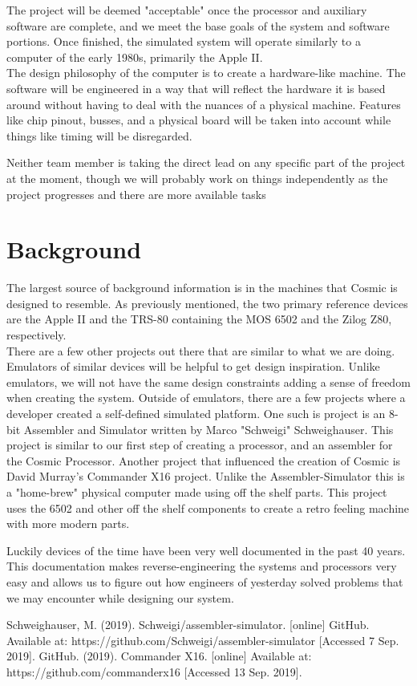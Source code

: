 \documentclass[conference]{IEEEtran}
\begin{document}
The project will be deemed "acceptable" once the processor and auxiliary software are complete, and we meet the base goals of the system and software portions. Once finished, the simulated system will operate similarly to a computer of the early 1980s, primarily the Apple II.\\ 

The design philosophy of the computer is to create a hardware-like machine. The software will be engineered in a way that will reflect the hardware it is based around without having to deal with the nuances of a physical machine. Features like chip pinout, busses, and a physical board will be taken into account while things like timing will be disregarded. 

Neither team member is taking the direct lead on any specific part of the project at the moment, though we will probably work on things independently as the project progresses and there are more available tasks

\section{Background}

The largest source of background information is in the machines that Cosmic is designed to resemble. As previously mentioned, the two primary reference devices are the Apple II and the TRS-80 containing the MOS 6502 and the Zilog Z80, respectively. \\

There are a few other projects out there that are similar to what we are doing. Emulators of similar devices will be helpful to get design inspiration. Unlike emulators, we will not have the same design constraints adding a sense of freedom when creating the system.  Outside of emulators, there are a few projects where a developer created a self-defined simulated platform. One such is project is an 8-bit Assembler and Simulator written by Marco "Schweigi" Schweighauser\cite{b1}. This project is similar to our first step of creating a processor, and an assembler for the Cosmic Processor. Another project that influenced the creation of Cosmic is David Murray's Commander X16 project\cite{b2}. Unlike the Assembler-Simulator this is a "home-brew" physical computer made using off the shelf parts. This project uses the 6502 and other off the shelf components to create a retro feeling machine with more modern parts. 

    Luckily devices of the time have been very well documented in the past 40 years. This documentation makes
reverse-engineering the systems and processors very easy and allows us to figure out how
engineers of yesterday solved problems that we may encounter while designing our system. 


\begin{thebibliography}{00}
 Schweighauser, M. (2019). Schweigi/assembler-simulator. [online] GitHub. Available at: https://github.com/Schweigi/assembler-simulator [Accessed 7 Sep. 2019].
GitHub. (2019). Commander X16. [online] Available at: https://github.com/commanderx16 [Accessed 13 Sep. 2019].

\end{thebibliography}
\end{document}
